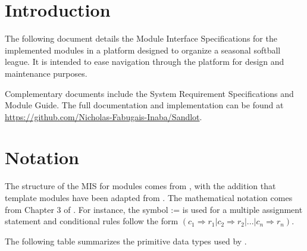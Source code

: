 \documentclass[12pt, titlepage]{article}
\begin{document}
\tableofcontents

\newpage


\section{Introduction}

The following document details the Module Interface Specifications for
the implemented modules in a platform designed to organize a seasonal
softball league. It is intended to ease navigation through the platform
for design and maintenance purposes.

Complementary documents include the System Requirement Specifications
and Module Guide.  The full documentation and implementation can be
found at \url{https://github.com/Nicholas-Fabugais-Inaba/Sandlot}.  

\section{Notation}

The structure of the MIS for modules comes from \citet{HoffmanAndStrooper1995},
with the addition that template modules have been adapted from
\cite{GhezziEtAl2003}.  The mathematical notation comes from Chapter 3 of
\citet{HoffmanAndStrooper1995}.  For instance, the symbol := is used for a
multiple assignment statement and conditional rules follow the form $(c_1
\Rightarrow r_1 | c_2 \Rightarrow r_2 | ... | c_n \Rightarrow r_n )$.

The following table summarizes the primitive data types used by \progname. 
\end{document}
